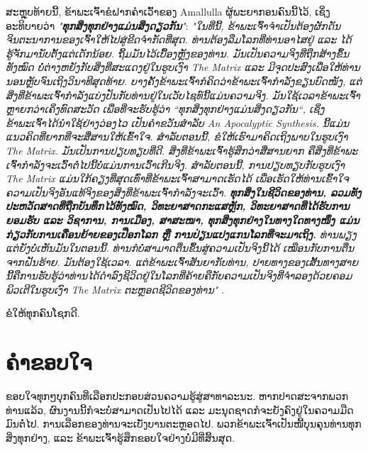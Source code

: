 \documentclass[10pt,twocolumn,letterpaper]{article}
\renewcommand{\refname}{ເອກະສານອ້າງອີງ}
\begin{document}
ສະຫຼຸບທ້າຍນີ້, ຂ້າພະເຈົ້າຂໍຝາກຄຳເວົ້າຂອງ Amallulla ຜູ້ພະຍາກອນຄົນນີ້ໄວ້, ເຊິ່ງອະທິບາຍວ່າ \textit{"\textbf{ທຸກສິ່ງທຸກຢ່າງແມ່ນສິ່ງດຽວກັນ}"}: \textit{"ໃນທີ່ນີ້, ຂ້າພະເຈົ້າຈຳເປັນຕ້ອງຜັກດັນຈິນຕະນາການຂອງເຈົ້າໃຫ້ໄປສູ່ຂີດຈຳກັດທີ່ສຸດ. ທ່ານຕ້ອງລືມໂລກທີ່ທ່ານອາໄສຢູ່ ແລະ ໄດ້ຮູ້ຈັກມານັບຕັ້ງແຕ່ເດັກນ້ອຍ. ຖິ້ມມັນໄວ້ເບື້ອງຫຼັງຂອງທ່ານ. ມັນເປັນຄວາມຈິງທີ່ຖືກສ້າງຂຶ້ນທັງໝົດ ບໍ່ຕ່າງຫຍັງກັບສິ່ງທີ່ສະແດງຢູ່ໃນຮູບເງົາ The Matrix ແລະ ມີຈຸດປະສົງເພື່ອໃຫ້ທ່ານນອນຫຼັບຈົນເຖິງວິນາທີສຸດທ້າຍ. ບາງຄັ້ງຂ້າພະເຈົ້າກໍຄິດວ່າຂ້າພະເຈົ້າກໍາລັງຂຽນບົດໜັງ, ແຕ່ສິ່ງທີ່ຂ້າພະເຈົ້າກໍາລັງແບ່ງປັນກັບທ່ານຢູ່ໃນເວັບໄຊທ໌ນີ້ແມ່ນຄວາມຈິງ. ມັນໃຊ້ເວລາຂ້າພະເຈົ້າຫຼາຍກວ່າເຄິ່ງທົດສະວັດ ເພື່ອທີ່ຈະຮັບຮູ້ວ່າ “ທຸກສິ່ງທຸກຢ່າງແມ່ນສິ່ງດຽວກັນ“, ເຊິ່ງຂ້າພະເຈົ້າໄດ້ນຳໃຊ້ຢ່າງວ່ອງໄວ ເປັນຄໍາຂວັນສໍາລັບ An Apocalyptic Synthesis. ນີ້ແມ່ນແນວຄິດທີ່ຍາກທີ່ຈະສື່ສານໃຫ້ເຂົ້າໃຈ. ສຳລັບຕອນນີ້, ຂໍໃຫ້ເຮົາມາຄິດເຖິງພາບໃນຮູບເງົາ The Matrix. ມັນເປັນການປຽບທຽບທີ່ດີ. ສິ່ງທີ່ຂ້າພະເຈົ້າຮູ້ສຶກວ່າສື່ສານຍາກ ຄືສິ່ງທີ່ຂ້າພະເຈົ້າກໍາລັງຈະເວົ້າຕໍ່ໄປນີ້ບໍ່ແມ່ນການເວົ້າເກີນຈິງ. 
ສຳລັບຕອນນີ້, ການປຽບທຽບກັບຮູບເງົາ The Matrix ແມ່ນໃກ້ຄຽງທີ່ສຸດເທົ່າທີ່ຂ້າພະເຈົ້າສາມາດເຮັດໄດ້ ເພື່ອເຮັດໃຫ້ທ່ານເຂົ້າໃຈຄວາມເປັນຈິງອັນແທ້ຈິງຂອງສິ່ງທີ່ຂ້າພະເຈົ້າກຳລັງຈະເວົ້າ. 
\textbf{ທຸກສິ່ງໃນຊີວິດຂອງທ່ານ, ລວມທັງປະຫວັດສາດທີ່ຖືກບັນທຶກໄວ້ທັງໝົດ, ວິທະຍາສາດກະແສຫຼັກ, ວິທະຍາສາດທີ່ໄດ້ຮັບການຍອມຮັບ ແລະ ວິຊາການ, ການເມືອງ, ສາສະໜາ, ທຸກສິ່ງທຸກຢ່າງໃນທາງໃດທາງໜຶ່ງ ແມ່ນກ່ຽວກັບການເຄື່ອນຍ້າຍຂອງເປືອກໂລກ ຫຼື ການປ່ຽນແປງແກນໂລກທີ່ຈະມາເຖິງ.} ທ່ານພຽງແຕ່ຍັງບໍ່ເຫັນມັນໃນຕອນນີ້. 
ທ່ານກໍບໍ່ສາມາດຕື່ນຂຶ້ນສູ່ຄວາມເປັນຈິງນີ້ໄດ້ ເໝືອນກັບການຕື່ນຈາກຝັນຮ້າຍ. ມັນຕ້ອງໃຊ້ເວລາ. 
ແຕ່ຂ້າພະເຈົ້າສັນຍາກັບທ່ານ, ປາຍທາງຂອງເສັ້ນທາງສາຍນີ້ຄືການຮັບຮູ້ວ່າທ່ານໄດ້ດໍາລົງຊີວິດຢູ່ໃນໂລກທີ່ຄ້າຍຄືກັບຄວາມເປັນຈິງທີ່ຈຳລອງດ້ວຍຄອມພິວເຕີໃນຮູບເງົາ The Matrix ຕະຫຼອດຊີວິດຂອງທ່ານ"} \cite{33,34}.

ຂໍໃຫ້ທຸກຄົນໂຊກດີ.
\section{ຄຳຂອບໃຈ}

ຂອບໃຈທຸກໆບຸກຄົນທີ່ເລືອກປະກອບສ່ວນຄວາມຮູ້ສູ່ສາທາລະນະ. ຫາກປາດສະຈາກພວກທ່ານແລ້ວ, ຜົນງານນີ້ກໍຈະບໍ່ສາມາດເປັນໄປໄດ້ ແລະ ມະນຸດຊາດກໍຈະຍັງຄົງຢູ່ໃນຄວາມມືດມົນຕໍ່ໄປ. ການເລືອກຂອງທ່ານຈະເບັ່ງບານຕະຫຼອດໄປ. ພວກຂ້າພະເຈົ້າເປັນໜີ້ບຸນຄຸນທ່ານທຸກສິ່ງທຸກຢ່າງ, ແລະ ຂ້າພະເຈົ້າຮູ້ສຶກຂອບໃຈຢ່າງບໍ່ມີທີ່ສິ້ນສຸດ.

\clearpage
\twocolumn

{\small


}
\end{document}
